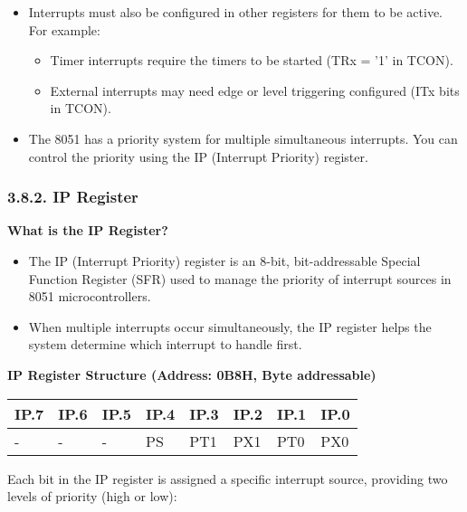 \documentclass[
]{article}
\begin{document}
\begin{itemize}
\item
  Interrupts must also be configured in other registers for them to be
  active. For example:

  \begin{itemize}
  \item
    Timer interrupts require the timers to be started (TRx = '1' in
    TCON).
  \item
    External interrupts may need edge or level triggering configured
    (ITx bits in TCON).
  \end{itemize}
\item
  The 8051 has a priority system for multiple simultaneous interrupts.
  You can control the priority using the IP (Interrupt Priority)
  register.
\end{itemize}

\hypertarget{382-ip-register}{%
\subsubsection{3.8.2. IP Register}\label{382-ip-register}}

\textbf{What is the IP Register?}

\begin{itemize}
\item
  The IP (Interrupt Priority) register is an 8-bit, bit-addressable
  Special Function Register (SFR) used to manage the priority of
  interrupt sources in 8051 microcontrollers.
\item
  When multiple interrupts occur simultaneously, the IP register helps
  the system determine which interrupt to handle first.
\end{itemize}

\textbf{IP Register Structure (Address: 0B8H, Byte addressable)}

\begin{longtable}[]{@{}llllllll@{}}
\toprule
IP.7 & IP.6 & IP.5 & IP.4 & IP.3 & IP.2 & IP.1 & IP.0 \\
\midrule
\endhead
- & - & - & PS & PT1 & PX1 & PT0 & PX0 \\
\bottomrule
\end{longtable}

Each bit in the IP register is assigned a specific interrupt source,
providing two levels of priority (high or low):
\end{document}
